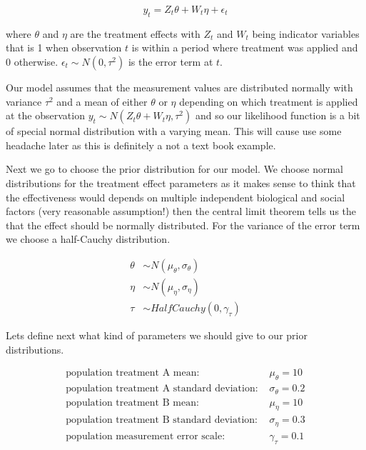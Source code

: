 \documentclass[12pt,a4paper,leqno]{report}
\theoremstyle{plain}
\theoremstyle{definition}
\theoremstyle{remark}
\begin{document}
\begin{def}\label{simplesinglepatientmodel}
    \begin{equation}\label{}
        y_t = Z_t\theta + W_t\eta + \epsilon_t
    \end{equation}
\end{def} where \(\theta \) and \(\eta \) are the treatment effects with \(Z_t\) and \(W_t\) being indicator
variables that is 1 when observation \(t\) is within a period where treatment was applied and
0 otherwise. \(\epsilon_{t} \sim N(0,\tau^2) \) is the error term at \(t\).

Our model assumes that the measurement values are distributed normally with
variance \(\tau^2\) and a mean of either \(\theta \) or \(\eta \) depending on which
treatment is applied at the observation \(y_t \sim N(Z_t\theta + W_t\eta, \tau^2)\) and
so our likelihood function is a bit of special normal distribution with a varying mean. This
will cause use some headache later as this is definitely a not a text book example.

Next we go to choose the prior distribution for our model. We choose
normal distributions for the treatment effect parameters as it makes sense to think
that the effectiveness would depends on multiple independent biological and social
factors (very reasonable assumption!) then the central limit theorem tells us the that
the effect should be normally distributed. For the variance of the error term we choose
a half-Cauchy distribution.

\begin{align}\label{}
    \theta &\sim N(\mu_{\theta}, \sigma_{\theta}) \\
    \eta &\sim N(\mu_{\eta}, \sigma_{\eta}) \nonumber \\
    \tau &\sim HalfCauchy(0, \gamma_{\tau}) \nonumber
\end{align}

Lets define next what kind of parameters we should give to our prior distributions.


\begin{align}\label{populationparameters}
    \text{population treatment A mean: } & \mu_{\theta} = 10 \\
    \text{population treatment A standard deviation: } & \sigma_{\theta} = 0.2 \nonumber \\
    \text{population treatment B mean: } & \mu_{\eta} = 10 \nonumber \\
    \text{population treatment B standard deviation: } & \sigma_{\eta} = 0.3 \nonumber \\
    \text{population measurement error scale: } & \gamma_{\tau} = 0.1 \nonumber
\end{align}
\end{document}
